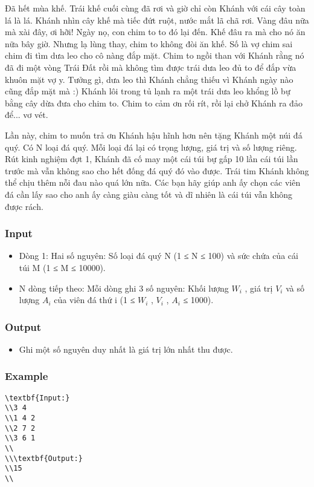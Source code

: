 



   Đã hết mùa khế. Trái khế cuối cùng đã rơi và giờ chỉ còn Khánh với cái cây toàn lá là lá. Khánh nhìn cây khế mà tiếc đứt ruột, nước mắt lã chã rơi. Vàng đâu nữa mà xài đây, ơi hỡi! Ngày nọ, con chim to to đó lại đến. Khế đâu ra mà cho nó ăn nữa bây giờ. Nhưng lạ lùng thay, chim to không đòi ăn khế. Số là vợ chim sai chim đi tìm dưa leo cho cô nàng đắp mặt. Chim to ngồi than với Khánh rằng nó đã đi một vòng Trái Đất rồi mà không tìm được trái dưa leo đủ to để đắp vừa khuôn mặt vợ y. Tưởng gì, dưa leo thì Khánh chẳng thiếu vì Khánh ngày nào cũng đắp mặt mà :) Khánh lôi trong tủ lạnh ra một trái dưa leo khổng lồ bự bằng cây dừa đưa cho chim to. Chim to cảm ơn rối rít, rồi lại chở Khánh ra đảo để... vơ vét.  

   Lần này, chim to muốn trả ơn Khánh hậu hĩnh hơn nên tặng Khánh một núi đá quý. Có N loại đá quý. Mỗi loại đá lại có trọng lượng, giá trị và số lượng riêng. Rút kinh nghiệm đợt 1, Khánh đã cố may một cái túi bự gấp 10 lần cái túi lần trước mà vẫn không sao cho hết đống đá quý đó vào được. Trái tim Khánh không thể chịu thêm nỗi đau nào quá lớn nữa. Các bạn hãy giúp anh ấy chọn các viên đá cần lấy sao cho anh ấy càng giàu càng tốt và dĩ nhiên là cái túi vẫn không được rách.  

\subsubsection{   Input  }
\begin{itemize}
	\item     Dòng 1: Hai số nguyên: Số loại đá quý N (1 ≤ N ≤ 100) và sức chứa của cái túi M (1 ≤ M ≤ 10000).   
	\item     N dòng tiếp theo: Mỗi dòng ghi 3 số nguyên: Khối lượng $W_{i}$    , giá trị $V_{i}$    và số lượng $A_{i}$    của viên đá thứ i (1 ≤ $W_{i}$    , $V_{i}$    , $A_{i}$    ≤ 1000).   
\end{itemize}

\subsubsection{   Output  }
\begin{itemize}
	\item     Ghi một số nguyên duy nhất là giá trị lớn nhất thu được.   
\end{itemize}

\subsubsection{   Example  }
\begin{verbatim}
\textbf{Input:}
\\3 4
\\1 4 2
\\2 7 2
\\3 6 1
\\
\\\textbf{Output:}
\\15
\\\end{verbatim}
